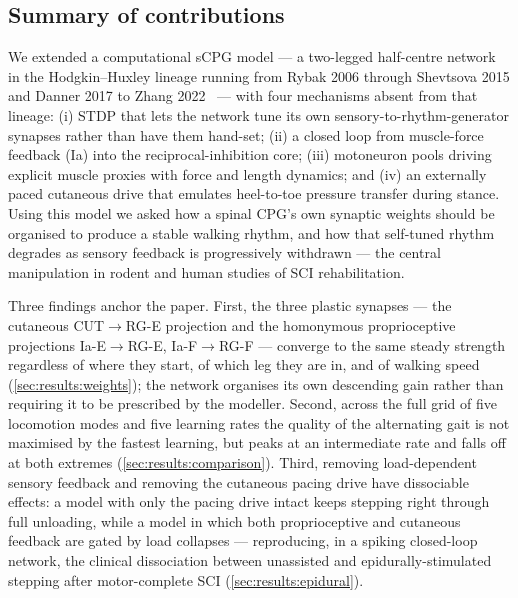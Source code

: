 \subsection{Summary of contributions}
We extended a computational sCPG model --- a two-legged half-centre
network in the Hodgkin--Huxley lineage
running from Rybak 2006 through Shevtsova 2015 and Danner 2017 to
Zhang 2022~\cite{rybak2006,shevtsova2015,danner2017,zhang2022} --- with four
mechanisms absent from that lineage: (i)
STDP that lets the network tune its own
sensory-to-rhythm-generator synapses rather than have them hand-set; (ii) a
closed loop from muscle-force feedback (Ia) into the reciprocal-inhibition
core; (iii) motoneuron pools driving explicit muscle proxies with force and
length dynamics; and (iv) an externally paced cutaneous drive that emulates
heel-to-toe pressure transfer during stance. Using this model we asked how a
spinal CPG's own synaptic weights should be organised to produce a stable
walking rhythm, and how that self-tuned rhythm degrades as sensory feedback
is progressively withdrawn --- the central manipulation in rodent and human
studies of SCI rehabilitation.

Three findings anchor the paper. First, the three plastic synapses --- the
cutaneous CUT$\to$RG-E projection and the homonymous proprioceptive
projections Ia-E$\to$RG-E, Ia-F$\to$RG-F --- converge to the same steady
strength regardless of where they start, of which leg they are in, and of
walking speed (\autoref{sec:results:weights}); the network organises its own
descending gain rather than requiring it to be prescribed by the modeller.
Second, across the full grid of five locomotion modes and five learning
rates the quality of the alternating gait is not maximised by the fastest
learning, but peaks at an intermediate rate and falls off at both extremes
(\autoref{sec:results:comparison}). Third, removing load-dependent sensory
feedback and removing the cutaneous pacing drive have dissociable effects:
a model with only the pacing drive intact keeps stepping right through full
unloading, while a model in which both proprioceptive and cutaneous
feedback are gated by load collapses --- reproducing, in a spiking
closed-loop network, the clinical dissociation between unassisted and
epidurally-stimulated stepping after motor-complete SCI
(\autoref{sec:results:epidural}).

